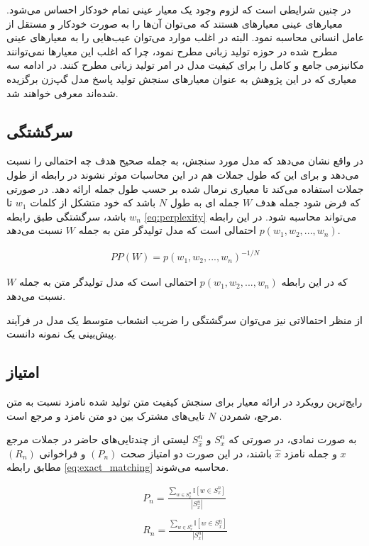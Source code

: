 در چنین شرایطی است که لزوم وجود یک معیار عینی تمام خودکار احساس می‌شود. معیارهای عینی معیارهای هستند که می‌توان  آن‌ها را به صورت خودکار و مستقل از عامل انسانی محاسبه نمود. البته در اغلب موارد می‌توان عیب‌هایی را به معیارهای عینی مطرح شده در حوزه تولید زبانی مطرح نمود، چرا که اغلب این معیارها نمی‌توانند مکانیزمی جامع و کامل را برای کیفیت مدل در امر تولید زبانی مطرح کنند. در ادامه سه معیاری که در این پژوهش به عنوان معیارهای سنجش تولید پاسخ مدل گپ‌زن برگزیده شده‌اند معرفی خواهند شد. 

\subsection{سرگشتگی}
 در واقع نشان می‌دهد که مدل مورد سنجش، به جمله صحیح هدف چه احتمالی را نسبت می‌دهد و برای این که طول جملات هم در این محاسبات موثر نشوند در رابطه از طول جملات استفاده می‌کند تا معیاری نرمال شده بر حسب طول جمله ارائه دهد. در صورتی که فرض شود جمله هدف
$W$
جمله ای به طول 
$N$
باشد که خود متشکل از کلمات
$w_1$ 
تا
$w_n$
باشد، سرگشتگی طبق رابطه
\ref{eq:perplexity}
 می‌تواند محاسبه شود. در این رابطه 
 $p(w_1, w_2, ..., w_n)$
 احتمالی است که مدل تولیدگر متن به جمله 
 $W$
 نسبت می‌دهد. 

\begin{gather} \label{eq:perplexity}
PP(W) = p(w_1, w_2, ..., w_n)^{-1/N}
\end{gather}

که در این رابطه 
$p(w_1, w_2, ..., w_n)$
احتمالی است که مدل تولیدگر متن به جمله 
$W$
نسبت می‌دهد. 

از منظر احتمالاتی نیز می‌توان سرگشتگی را ضریب انشعاب متوسط یک مدل در فرآیند پیش‌بینی یک نمونه دانست.

\subsection{
امتیاز
}

رایج‌ترین رویکرد در ارائه معیار برای سنجش کیفیت متن تولید شده نامزد نسبت به متن مرجع،‌ شمردن 
$N$
تایی‌های مشترک بین دو متن نامزد و مرجع است. 

به صورت نمادی، در صورتی که 
$S_{x}^{n}$
و
$S_{\hat{x}}^{n}$
لیستی از چندتایی‌های حاضر در جملات مرجع 
$x$
و جمله نامزد 
$\hat{x}$
باشند، در این صورت دو امتیاز صحت 
$ (P_n) $
و فراخوانی 
$(R_n)$
مطابق رابطه
\ref{eq:exact_matching}
 محاسبه می‌شوند.

\begin{align}\label{eq:exact_matching}
 P_n = \frac{
\sum_{w \in S_{\hat{x}}^{n} }^{} \mathbb{I}[w \in S_{x}^{n}]
}{|S_{\hat{x}}^{n}|}  \\ \nonumber \\ \nonumber
 R_n = \frac{
	\sum_{w \in S_{x}^{n} }^{} \mathbb{I}[w \in  S_{\hat{x}}^{n}]
}{|S_{x}^{n}|}
\end{align}


